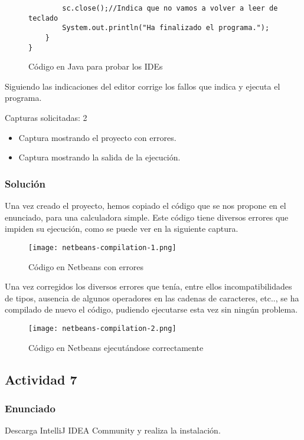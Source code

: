 \begin{figure}[H]
\begin{tcolorbox}[sharp corners, colback=yellow!30, colframe=white!20]
\begin{verbatim}
        sc.close();//Indica que no vamos a volver a leer de teclado
        System.out.println("Ha finalizado el programa.");
    }
}         \end{verbatim}
    \end{tcolorbox}
    \caption{Código en Java para probar los IDEs}
\end{figure}

Siguiendo las indicaciones del editor corrige los fallos que indica y ejecuta el programa.

Capturas solicitadas: 2
\begin{itemize}
    \item Captura mostrando el proyecto con errores.
    \item Captura mostrando la salida de la ejecución.
\end{itemize}

\vspace{2ex}

\subsubsection{Solución}
Una vez creado el proyecto, hemos copiado el código que se nos propone en el enunciado, para una calculadora simple. Este código tiene diversos errores que impiden su ejecución, como se puede ver en la siguiente captura.

\begin{figure}[ht]
    \centering
    \texttt{[image: netbeans-compilation-1.png]}
    \caption{Código en Netbeans con errores}
\end{figure}

Una vez corregidos los diversos errores que tenía, entre ellos incompatibilidades de tipos, ausencia de algunos operadores en las cadenas de caracteres, etc.., se ha compilado de nuevo el código, pudiendo ejecutarse esta vez sin ningún problema.

\begin{figure}[ht]
    \centering
    \texttt{[image: netbeans-compilation-2.png]}
    \caption{Código en Netbeans ejecutándose correctamente}
\end{figure}

\subsection{Actividad 7}
\subsubsection{Enunciado}
Descarga IntelliJ IDEA Community y realiza la instalación.


